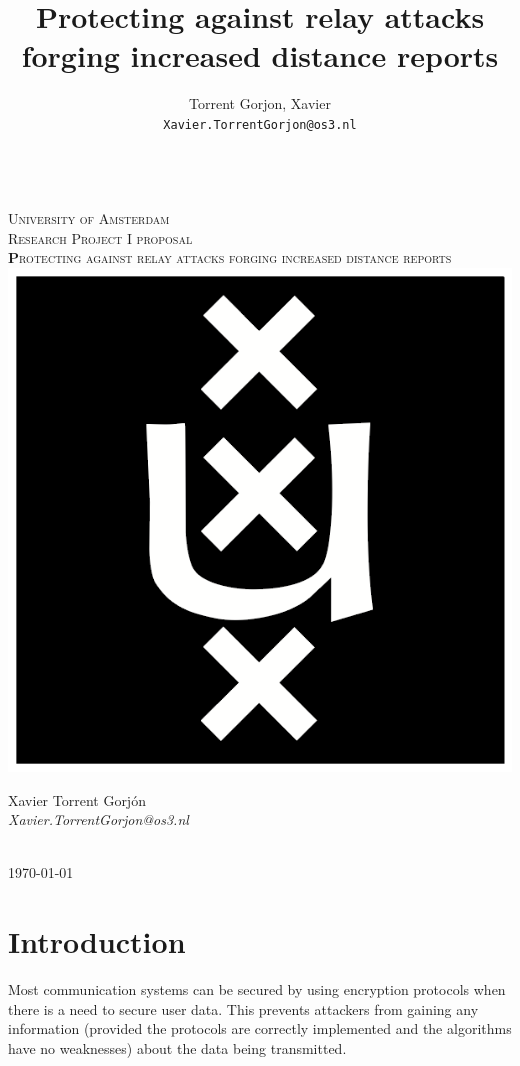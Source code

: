 \documentclass{article}
\author{
  Torrent Gorjon, Xavier\\
  \texttt{Xavier.TorrentGorjon@os3.nl}
}
\title{Protecting against relay attacks forging increased distance reports}
\begin{document}
\begin{titlepage}
\center
\textsc{}\\[1cm]
\textsc{\LARGE University of Amsterdam}\\[1.5cm]

\textsc{\Large Research Project I proposal}\\[0.5cm]

\textsc{\Huge \textbf Protecting against relay attacks forging increased distance reports}\\[1.5cm]

\includegraphics[scale=1]{images/uva.png}\\[1cm]

\begin{minipage}{0.5 \textwidth}
\begin{center} \large
Xavier Torrent Gorj\'{o}n\\
\emph{Xavier.TorrentGorjon@os3.nl}\\[0.5cm]
\end{center}
\end{minipage}\\[2cm]
{\large \today} 


\end{titlepage}


\newpage

\tableofcontents
\section{Introduction}
Most communication systems can be secured by using encryption protocols when there is a need to secure user data. This prevents attackers from gaining any information (provided the protocols are correctly implemented and the algorithms have no weaknesses) about the data being transmitted.
\end{document}
